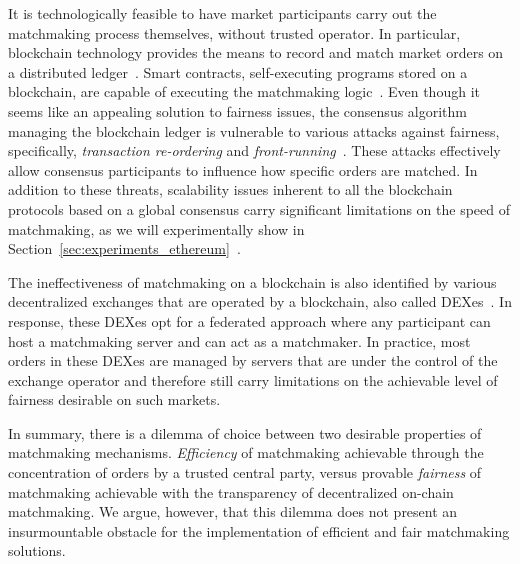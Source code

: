 It is technologically feasible to have market participants carry out the matchmaking process themselves, without trusted operator.
In particular, blockchain technology provides the means to record and match market orders on a distributed ledger~\cite{subramanian2017decentralized}.
Smart contracts, self-executing programs stored on a blockchain, are capable of executing the matchmaking logic~\cite{luu2016making}.
Even though it seems like an appealing solution to fairness issues, the consensus algorithm managing the blockchain ledger is vulnerable to various attacks against fairness, specifically, \emph{transaction re-ordering} and \emph{front-running}~\cite{eskandari2019,kolluri2018,judmayer2019}.
These attacks effectively allow consensus participants to influence how specific orders are matched.
In addition to these threats, scalability issues inherent to all the blockchain protocols based on a global consensus carry significant limitations on the speed of matchmaking, as we will experimentally show in Section~\ref{sec:experiments_ethereum}~\cite{daian2019}.


The ineffectiveness of matchmaking on a blockchain is also identified by various decentralized exchanges that are operated by a blockchain, also called DEXes~\cite{eskandari2019,warren20170x,idex}.
In response, these DEXes opt for a federated approach where any participant can host a matchmaking server and can act as a matchmaker.
In practice, most orders in these DEXes are managed by servers that are under the control of the exchange operator and therefore still carry limitations on the achievable level of fairness desirable on such markets.

In summary, there is a dilemma of choice between two desirable properties of matchmaking mechanisms.
\emph{Efficiency} of matchmaking achievable through the concentration of orders by a trusted central party, versus provable \emph{fairness} of matchmaking achievable with the transparency of decentralized on-chain matchmaking.
We argue, however, that this dilemma does not present an insurmountable obstacle for the implementation of efficient and fair matchmaking solutions.

